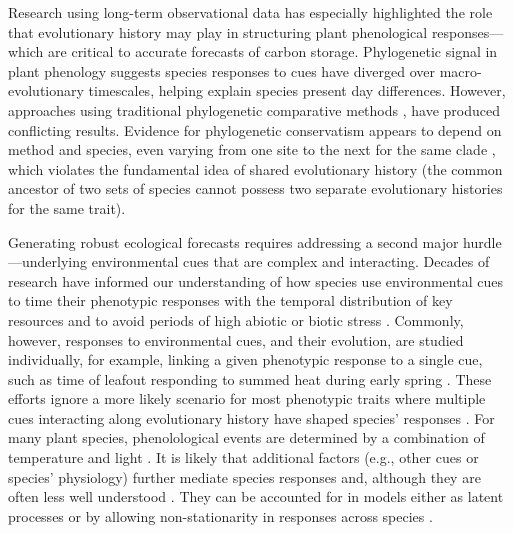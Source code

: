 \documentclass[11pt]{article}
\begin{document}
Research using long-term observational data has especially highlighted the role that evolutionary history may play in structuring plant phenological responses---which are critical to accurate forecasts of carbon storage. Phylogenetic signal in plant phenology \citep{kochmer1986constraints,willis2008phylogenetic,davies2013phylogenetic} suggests species responses to cues have diverged over macro-evolutionary timescales, helping explain species present day differences. 
However, approaches using traditional phylogenetic comparative methods \citep[e.g.,][]{willis2008phylogenetic,CaraDonna2015,yang2021afm}, have produced conflicting results. Evidence for phylogenetic conservatism appears to depend on method and species, even varying from one site to the next for the same clade \citep[e.g.,][]{rafferty2017global}, which violates the fundamental idea of shared evolutionary history (the common ancestor of two sets of species cannot possess two separate evolutionary histories for the same trait). 

Generating robust ecological forecasts requires addressing a second major hurdle---underlying environmental cues that are complex and interacting. Decades of research have informed our understanding of how species use environmental cues to time their phenotypic responses with the temporal distribution of key resources and to avoid periods of high abiotic or biotic stress \citep{larcher1980,bonamour2019}. Commonly, however, responses to environmental cues, and their evolution, are studied individually, for example, linking a given phenotypic response to a single cue, such as time of leafout responding to summed heat during early spring \citep[e.g.,][]{davies2013phylogenetic}. These efforts ignore a more likely scenario for most phenotypic traits where multiple cues interacting along evolutionary history have shaped species' responses \citep{Ackerly:2009ly}. For many plant species, phenolological events are determined by a combination of temperature and light \citep{chuinearees}. It is likely that additional factors (e.g., other cues or species' physiology) further mediate species responses and, although they are often less well understood \citep{chuinearees}. They can be accounted for in models either as latent processes or by allowing non-stationarity in responses across species \citep{davies2019phylogenetically}.  
\end{document}
